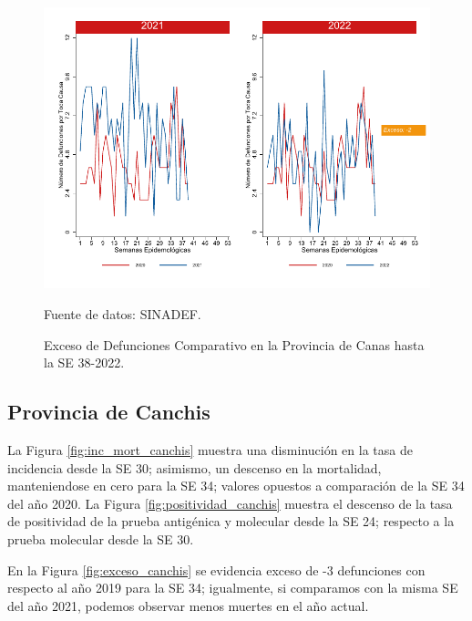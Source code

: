 \documentclass[12pt,a4paper,openany]{book}
\begin{document}
	\begin{figure}[h]
		\caption{Exceso de Defunciones Comparativo en la Provincia de Canas hasta la SE 38-2022.}\label{fig:exceso_canas}
		\begin{center}
			\includegraphics[width=0.7\linewidth]{../figuras/exceso_4.pdf}
		\end{center}
		{\footnotesize {Fuente de datos: SINADEF.}}
	\end{figure}
	
	\clearpage
	
	\subsection*{Provincia de Canchis}
	\noindent La Figura \ref{fig:inc_mort_canchis} muestra una disminución en la tasa de incidencia desde la SE 30; asimismo, un descenso en la mortalidad, manteniendose en cero para la SE 34; valores opuestos a comparación de la SE 34 del año 2020.
	\noindent La Figura \ref{fig:positividad_canchis} muestra el descenso de la tasa de positividad de la prueba antigénica  y molecular desde la SE 24; respecto a la prueba molecular desde la SE 30.
	
	En la Figura \ref{fig:exceso_canchis} se evidencia exceso de -3 defunciones con respecto al año 2019 para la SE 34; igualmente, si comparamos con la misma SE del año 2021, podemos observar menos muertes en el año actual.
	
\end{document}
